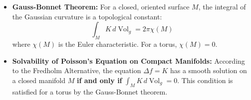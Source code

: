 \begin{solution}
\begin{itemize}
\begin{itemize}
\begin{equation*}
        \end{equation*}
        where $R$ is the Riemann curvature tensor.
        \item \textbf{Cartan's Structural Equations:} Using a local orthonormal coframe $\{\theta^1, \theta^2\}$, there is a unique connection 1-form $\omega_{12}$ such that $d\theta^1 = -\omega_{12} \wedge \theta^2$ and $d\theta^2 = \omega_{12} \wedge \theta^1$. The curvature is then:
        \begin{equation*}
            d\omega_{12} = -K \theta^1 \wedge \theta^2
        \end{equation*}
        \item \textbf{Principal Curvatures:} For a surface embedded in $\mathbb{R}^3$, $K$ is the product of the two principal curvatures: $K = \kappa_1 \kappa_2$. 
        \item \textbf{Local Coordinate Formula (The Brioschi Formula):} For a metric $ds^2 = E du^2 + 2F du dv + G dv^2$:
        \begin{equation*}
            K = \frac{\det \begin{pmatrix} -\frac{1}{2}E_{vv} + F_{uv} - \frac{1}{2}G_{uu} & \frac{1}{2}E_u & F_u - \frac{1}{2}E_v \\ F_v - \frac{1}{2}G_u & E & F \\ \frac{1}{2}G_v & F & G \end{pmatrix} - \det \begin{pmatrix} 0 & \frac{1}{2}E_v & \frac{1}{2}G_u \\ \frac{1}{2}E_v & E & F \\ \frac{1}{2}G_u & F & G \end{pmatrix}}{(EG - F^2)^2}
        \end{equation*}
    \end{itemize}
    \item \textbf{Gauss-Bonnet Theorem:} 
    For a closed, oriented surface $M$, the integral of the Gaussian curvature is a topological constant:
    \begin{equation*}
        \int_M K \, d\operatorname{Vol}_g = 2\pi \chi(M)
    \end{equation*}
    where $\chi(M)$ is the Euler characteristic. For a torus, $\chi(M) = 0$.

    \item \textbf{Solvability of Poisson's Equation on Compact Manifolds:} 
    According to the Fredholm Alternative, the equation $\Delta f = K$ has a smooth solution on a closed manifold $M$ \textbf{if and only if} $\int_M K \, d\operatorname{Vol}_g = 0$. This condition is satisfied for a torus by the Gauss-Bonnet theorem.


\end{itemize}
\end{solution}
